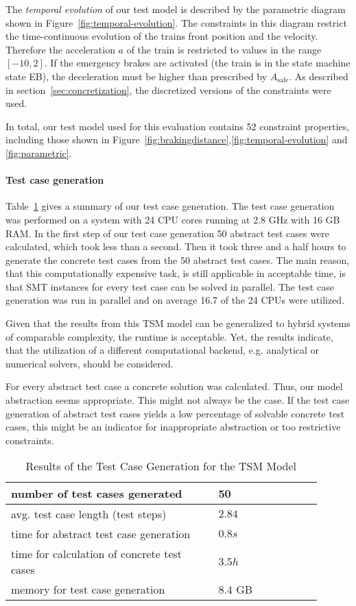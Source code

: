 The \emph{temporal evolution} of our test model is described by the parametric
diagram shown in Figure~\ref{fig:temporal-evolution}. The constraints in this diagram
restrict the time-continuous evolution of the trains front position and the velocity.
Therefore the acceleration $a$ of the train is restricted to values in the range $[-10,2]$. 
If the emergency brakes are activated (the train is in the state machine
state EB), the deceleration must be higher than prescribed by $A_\text{safe}$.  
As described in section~\ref{sec:concretization}, the discretized versions of
the constraints were used.

In total, our test model used for this evaluation contains 52 constraint properties,
including those shown in Figure~\ref{fig:brakingdistance},\ref{fig:temporal-evolution} and \ref{fig:parametric}.

\paragraph{Test case generation}

Table~\ref{tab:testgen} gives a summary of our test case generation. The test
case generation was performed on a system with 24 CPU cores running at 2.8 GHz
with 16 GB RAM. In the first step of our test case generation 50 abstract test
cases were calculated, which took less than a second. 
Then it took three and a half hours to generate the concrete test
cases from the 50 abstract test cases. The main reason, that this
computationally expensive task, is still applicable in acceptable time, is that
SMT instances for every test case can be solved in parallel. The test case
generation was run in parallel and on average 16.7 of the 24 CPUs were
utilized.

Given that the results from this TSM model can be generalized to hybrid systems
of comparable complexity, the runtime is acceptable. Yet, the
results indicate, that the utilization of a different computational backend,
e.g. analytical or numerical solvers, should be considered.

For every abstract test case a concrete
solution was calculated. Thus, our model abstraction seems appropriate. This might not always
be the case. If the test case generation of abstract test cases yields a low
percentage of solvable concrete test cases, this might be an indicator for
inappropriate abstraction or too restrictive constraints.


\begin{table}[h]
\centering
\begin{tabular}{|p{0.6\linewidth}|p{0.3\linewidth}|}
\hline
number of test cases generated & 50 \\
\hline
avg. test case length (test steps) & $2.84$ \\
 \hline
time for abstract test case generation & $0.8s$ \\
 \hline
time for calculation of concrete test cases & $3.5h$ \\
 \hline
 memory for test case generation & 8.4 GB\\
 \hline 
\end{tabular}
\caption{Results of the Test Case Generation for the TSM Model}
\label{tab:testgen}
\end{table}